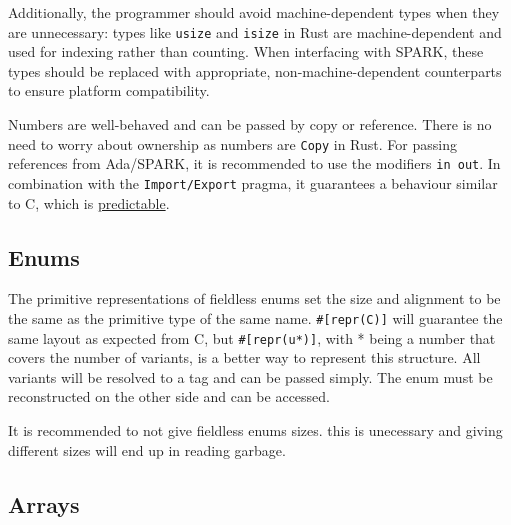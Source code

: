 \documentclass[nomenclature, english, bibtex]{kththesis}
\begin{document}
Additionally, the programmer should avoid machine-dependent types when they are unnecessary: types like \texttt{usize} and \texttt{isize} in Rust are machine-dependent and used for indexing rather than counting. When interfacing with SPARK, these types should be replaced with appropriate, non-machine-dependent counterparts to ensure platform compatibility.

Numbers are well-behaved and can be passed by copy or reference. There is no need to worry about ownership as numbers are \texttt{Copy} in Rust. For passing references from Ada/SPARK, it is recommended to use the modifiers \texttt{in out}. In combination with the \texttt{Import/Export} pragma, it guarantees a behaviour similar to C, which is \href{https://en.wikibooks.org/wiki/Ada_Programming/Types/access}{predictable}.


\subsection{Enums}

The primitive representations of fieldless enums set the size and alignment to be the same as the primitive type of the same name. \texttt{\#[repr(C)]} will guarantee the same layout as expected from C, but \texttt{\#[repr(u*)]}, with * being a number that covers the number of variants, is a better way to represent this structure. All variants will be resolved to a tag and can be passed simply. The enum must be reconstructed on the other side and can be accessed.

It is recommended to not give fieldless enums sizes. this is unecessary and giving different sizes will end up in reading garbage.

\subsection{Arrays}
\end{document}
